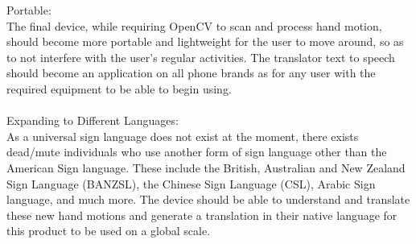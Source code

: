 \documentclass{article}
\begin{document}
Portable:\\
The final device, while requiring OpenCV to scan and process hand motion, should become more portable and lightweight for the user to move around, so as to not interfere with the user’s regular activities. The translator text to speech should become an application on all phone brands as for any user with the required equipment to be able to begin using.
\\
\\Expanding to Different Languages:\\
As a universal sign language does not exist at the moment, there exists dead/mute individuals who use another form of sign language other than the American Sign language. These include the British, Australian and New Zealand Sign Language (BANZSL), the Chinese Sign Language (CSL), Arabic Sign language, and much more. The device should be able to understand and translate these new hand motions and generate a translation in their native language for this product to be used on a global scale.
\end{document}
